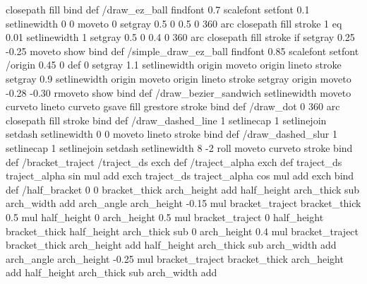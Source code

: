 {{	closepath fill %
} bind def %
/draw_ez_ball %
{ %
	findfont 0.7 scalefont setfont  %
	0.1 setlinewidth %
	0 0 moveto %
	0 setgray %
	0.5 0 0.5 0 360 arc closepath fill stroke %
	1 eq { %
		0.01 setlinewidth %
		1 setgray %
		0.5 0 0.4 0 360 arc closepath %
		fill stroke %
	} if  %
	setgray %
	0.25 -0.25 moveto %
	show %
} bind def %
/simple_draw_ez_ball %
{ %
	findfont 0.85 scalefont setfont %
	/origin { 0.45 0 } def %
	0 setgray %
	1.1 setlinewidth %
	origin moveto %
	origin lineto stroke %
 	setgray %
	0.9 setlinewidth %
	origin moveto %
	origin lineto stroke %
	setgray %
	origin moveto %
	-0.28 -0.30 rmoveto %
	show %
} bind def %
/draw_bezier_sandwich  %
{  %
	setlinewidth  %
	moveto  %
	curveto  %
	lineto  %
	curveto  %
	gsave  %
	fill  %
	grestore  %
	stroke  %
} bind def  %
/draw_dot %
{ %
	0 360 arc closepath fill stroke %
} bind def %
/draw_dashed_line %
{  %
	1 setlinecap  %
	1 setlinejoin  %
	setdash  %
	setlinewidth  %
	0 0 moveto %
	lineto %
	stroke  %
} bind def  %
/draw_dashed_slur %
{  %
	1 setlinecap  %
	1 setlinejoin  %
	setdash  %
	setlinewidth  %
	8 -2 roll  %
	moveto  %
	curveto  %
	stroke  %
} bind def  %
/bracket_traject  %
{  %
	/traject_ds exch def  %
	/traject_alpha exch def  %
	traject_ds traject_alpha sin mul add  %
	exch  %
	traject_ds traject_alpha cos mul add  %
	exch  %
} bind def  %
/half_bracket %
{  %
	0 0  %
	bracket_thick arch_height add half_height arch_thick sub arch_width add  %
	arch_angle arch_height -0.15 mul bracket_traject  %
	bracket_thick 0.5 mul half_height  %
	0 arch_height 0.5 mul bracket_traject  %
	0 half_height  %
	bracket_thick half_height arch_thick sub  %
	0 arch_height 0.4 mul bracket_traject  %
	bracket_thick arch_height add half_height arch_thick sub arch_width add  %
	arch_angle arch_height -0.25 mul bracket_traject  %
	bracket_thick arch_height add half_height arch_thick sub arch_width add  %
}}
